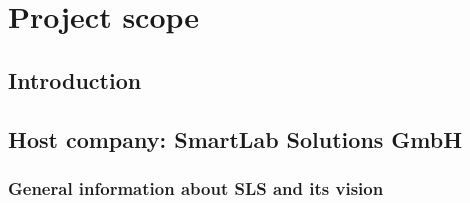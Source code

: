 \chapter{Project scope}

\renewcommand{\chaptername}{Chapter}

\section*{Introduction}


\begin{sloppypar}
\section{Host company: SmartLab Solutions GmbH}
\end{sloppypar}


\subsection{General information about SLS and its vision}

